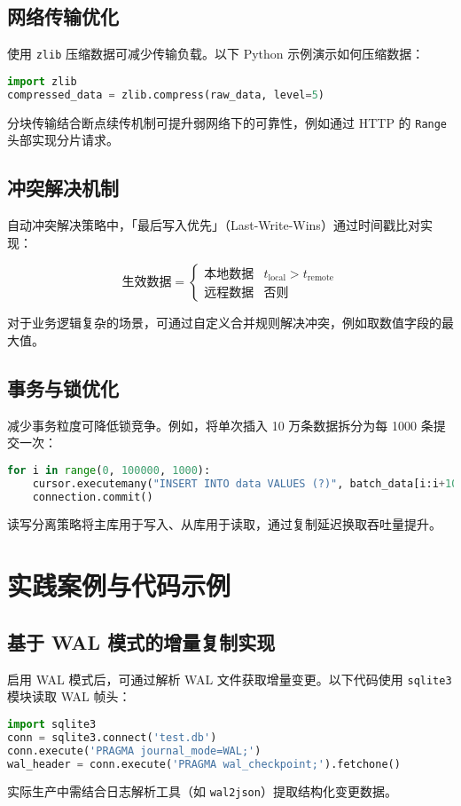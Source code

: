 \section{网络传输优化}
使用 \verb!zlib! 压缩数据可减少传输负载。以下 Python 示例演示如何压缩数据：\par
\begin{lstlisting}[language=python]
import zlib
compressed_data = zlib.compress(raw_data, level=5)
\end{lstlisting}
分块传输结合断点续传机制可提升弱网络下的可靠性，例如通过 HTTP 的 \verb!Range! 头部实现分片请求。\par
\section{冲突解决机制}
自动冲突解决策略中，「最后写入优先」（Last-Write-Wins）通过时间戳比对实现：\par
$$ \text{生效数据} = \begin{cases} \text{本地数据} & t_{\text{local}} > t_{\text{remote}} \\ \text{远程数据} & \text{否则} \end{cases} $$\par
对于业务逻辑复杂的场景，可通过自定义合并规则解决冲突，例如取数值字段的最大值。\par
\section{事务与锁优化}
减少事务粒度可降低锁竞争。例如，将单次插入 10 万条数据拆分为每 1000 条提交一次：\par
\begin{lstlisting}[language=python]
for i in range(0, 100000, 1000):
    cursor.executemany("INSERT INTO data VALUES (?)", batch_data[i:i+1000])
    connection.commit()
\end{lstlisting}
读写分离策略将主库用于写入、从库用于读取，通过复制延迟换取吞吐量提升。\par
\chapter{实践案例与代码示例}
\section{基于 WAL 模式的增量复制实现}
启用 WAL 模式后，可通过解析 WAL 文件获取增量变更。以下代码使用 \verb!sqlite3! 模块读取 WAL 帧头：\par
\begin{lstlisting}[language=python]
import sqlite3
conn = sqlite3.connect('test.db')
conn.execute('PRAGMA journal_mode=WAL;')
wal_header = conn.execute('PRAGMA wal_checkpoint;').fetchone()
\end{lstlisting}
实际生产中需结合日志解析工具（如 \verb!wal2json!）提取结构化变更数据。\par
